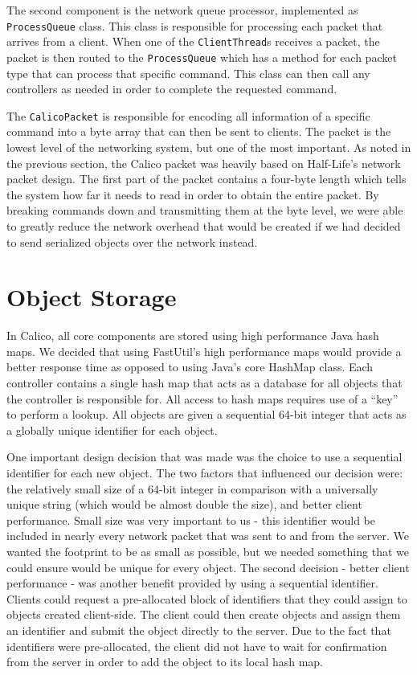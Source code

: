 The second component is the network queue processor, implemented as \texttt{ProcessQueue} class. This class is responsible for processing each packet that arrives from a client. When one of the \texttt{ClientThread}s receives a packet, the packet is then routed to the \texttt{ProcessQueue} which has a method for each packet type that can process that specific command. This class can then call any controllers as needed in order to complete the requested command.

The \texttt{CalicoPacket} is responsible for encoding all information of a specific command into a byte array that can then be sent to clients. The packet is the lowest level of the networking system, but one of the most important. As noted in the previous section, the Calico packet was heavily based on Half-Life's network packet design. The first part of the packet contains a four-byte length which tells the system how far it needs to read in order to obtain the entire packet. By breaking commands down and transmitting them at the byte level, we were able to greatly reduce the network overhead that would be created if we had decided to send serialized objects over the network instead.


\section{Object Storage}
In Calico, all core components are stored using high performance Java hash maps. 
We decided that using FastUtil's\cite{fastutil} high performance maps would provide a better response time as opposed to using Java's core HashMap class. 
Each controller contains a single hash map that acts as a database for all objects that the controller is responsible for.
All access to hash maps requires use of a ``key'' to perform a lookup.
All objects are given a sequential 64-bit integer that acts as a globally unique identifier for each object.

One important design decision that was made was the choice to use a sequential identifier for each new object. The two factors that influenced our decision were: the relatively small size of a 64-bit integer in comparison with a universally unique string (which would be almost double the size), and better client performance.
Small size was very important to us - this identifier would be included in nearly every network packet that was sent to and from the server. We wanted the footprint to be as small as possible, but we needed something that we could ensure would be unique for every object. 
The second decision - better client performance - was another benefit provided by using a sequential identifier. Clients could request a pre-allocated block of identifiers that they could assign to objects created client-side. The client could then create objects and assign them an identifier and submit the object directly to the server. Due to the fact that identifiers were pre-allocated, the client did not have to wait for confirmation from the server in order to add the object to its local hash map.

